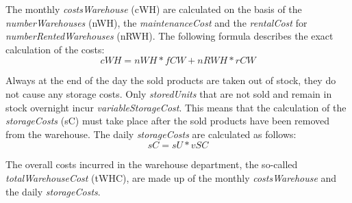 The monthly \textit{costsWarehouse} (\gls{cWH}) are calculated on the basis of the \textit{numberWarehouses} (\gls{nWH}), the \textit{maintenanceCost} and the \textit{rentalCost} for \textit{numberRentedWarehouses} (\gls{nRWH}). The following formula describes the exact calculation of the costs:
\begin{equation}
\label{func:cWH} %
     cWH = nWH * fCW + nRWH * rCW
\end{equation}

Always at the end of the day the sold products are taken out of stock, they do not cause any storage costs. Only \textit{storedUnits} that are not sold and remain in stock overnight incur \textit{variableStorageCost}. This means that the calculation of the \textit{storageCosts} (\gls{sC}) must take place after the sold products have been removed from the warehouse. The daily \textit{storageCosts} are calculated as follows:
\begin{equation}
\label{func:SC} %
    sC = sU * vSC
\end{equation}

The overall costs incurred in the warehouse department, the so-called \textit{totalWarehouseCost} (\gls{tWHC}), are made up of the monthly \textit{costsWarehouse} and the daily \textit{storageCosts}. 